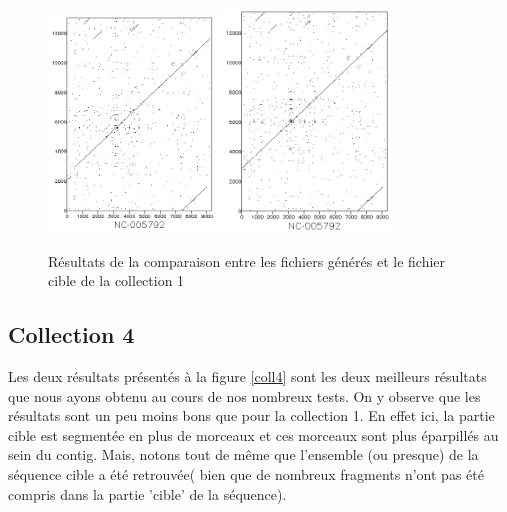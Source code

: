 \documentclass[12pt,a4paper,final]{article}
\begin{document}
\begin{figure}[!ht]
	\centering
	\includegraphics[width=0.4\textwidth]{images/collection1/collection1_2.png}
	\includegraphics[width=0.4\textwidth]{images/collection1/collection1_16.png}
	\caption{\label{coll1}Résultats de la comparaison entre les fichiers générés et le fichier cible de la collection 1}
\end{figure}

\subsection{Collection 4}
Les deux résultats présentés à la figure \ref{coll4} sont les deux meilleurs résultats que nous ayons obtenu au cours de nos nombreux tests. On y observe que les résultats sont un peu moins bons que pour la collection 1. En effet ici, la partie cible est segmentée en plus de morceaux et ces morceaux sont plus éparpillés au sein du contig. Mais, notons tout de même que l'ensemble (ou presque) de la séquence cible a été retrouvée( bien que de nombreux fragments n'ont pas été compris dans la partie 'cible' de la séquence).
\end{document}

